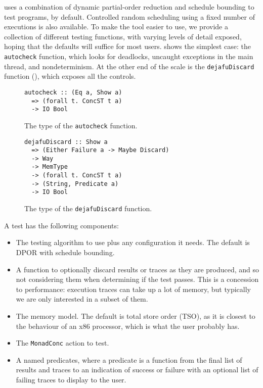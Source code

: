 \dejafu{} uses a combination of dynamic partial-order reduction and
schedule bounding to test programs, by default.  Controlled random
scheduling using a fixed number of executions is also available.  To
make the tool easier to use, we provide a collection of different
testing functions, with varying levels of detail exposed, hoping that
the defaults will suffice for most users.   shows
the simplest case: the \verb|autocheck| function, which looks for
deadlocks, uncaught exceptions in the main thread, and nondeterminism.
At the other end of the scale is the \verb|dejafuDiscard| function
(), which exposes all the controls.

\begin{figure}[t]
  \centering
  \begin{lstlisting}
autocheck :: (Eq a, Show a)
  => (forall t. ConcST t a)
  -> IO Bool
  \end{lstlisting}
  \caption{The type of the \texttt{autocheck} function.}
  \label{fig:autocheck}
\end{figure}

\begin{figure}[t]
  \centering
  \begin{lstlisting}
dejafuDiscard :: Show a
  => (Either Failure a -> Maybe Discard)
  -> Way
  -> MemType
  -> (forall t. ConcST t a)
  -> (String, Predicate a)
  -> IO Bool
  \end{lstlisting}
  \caption{The type of the \texttt{dejafuDiscard} function.}
  \label{fig:dejafuDiscard}
\end{figure}

A \dejafu{} test has the following components:

\begin{itemize}
\item The testing algorithm to use plus any configuration it needs.
  The default is DPOR with schedule bounding.
\item A function to optionally discard results or traces as they are
  produced, and so not considering them when determining if the test
  passes.  This is a concession to performance: execution traces can
  take up a lot of memory, but typically we are only interested in a
  subset of them.
\item The memory model.  The default is total store order (TSO), as it
  is closest to the behaviour of an x86 processor\cite{owens2009},
  which is what the user probably has.
\item The \verb|MonadConc| action to test.
\item A named predicates, where a predicate is a function from the
  final list of results and traces to an indication of success or
  failure with an optional list of failing traces to display to the
  user.
\end{itemize}

